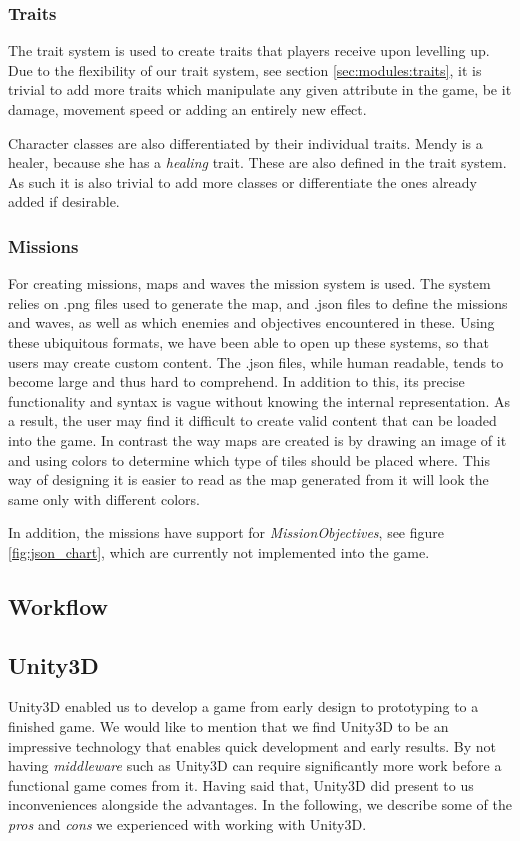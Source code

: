 \subsubsection{Traits}\label{dicsussion:traits}
The trait system is used to create traits that players receive upon levelling up.
Due to the flexibility of our trait system, see section \ref{sec:modules:traits}, it is trivial to add more traits which manipulate any given attribute in the game, be it damage, movement speed or adding an entirely new effect. 

Character classes are also differentiated by their individual traits.
Mendy is a healer, because she has a \emph{healing} trait.
These are also defined in the trait system.
As such it is also trivial to add more classes or differentiate the ones already added if desirable.

\subsubsection{Missions}\label{dicsussion:missions}
For creating missions, maps and waves the mission system is used.
The system relies on .png files used to generate the map, and .json files to define the missions and waves, as well as which enemies and objectives encountered in these.
Using these ubiquitous formats, we have been able to open up these systems, so that users may create custom content.
The .json files, while human readable, tends to become large and thus hard to comprehend.
In addition to this, its precise functionality and syntax is vague without knowing the internal representation.
As a result, the user may find it difficult to create valid content that can be loaded into the game.
In contrast the way maps are created is by drawing an image of it and using colors to determine which type of tiles should be placed where. This way of designing it is easier to read as the map generated from it will look the same only with different colors.

In addition, the missions have support for \textit{MissionObjectives}, see figure \ref{fig:json_chart}, which are currently not implemented into the game.

\subsection{Workflow}

\subsection{Unity3D}
Unity3D enabled us to develop a game from early design to prototyping to a
finished game. We would like to mention that we find Unity3D to be an
impressive technology that enables quick development and early results. By not
having \textit{middleware} such as Unity3D can require significantly more work
before a functional game comes from it.
Having said that, Unity3D did present to us inconveniences alongside the
advantages. In the following, we describe some of the \textit{pros} and
\textit{cons} we experienced with working with Unity3D.

